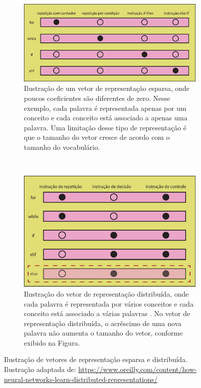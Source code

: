 \begin{figure}[H]
\centering
\begin{subfigure}{.7\textwidth}
  \centering
  \includegraphics[width=1\linewidth]{figuras/cap-trabalhos-relacionados/discrete-representation.pdf}
  \caption{Ilustração de um vetor de representação esparsa, onde poucos coeficientes são diferentes de zero. Nesse exemplo, cada palavra é representada apenas por um conceito e cada conceito está associado a apenas uma palavra. Uma limitação desse tipo de representação é que o tamanho do vetor cresce de acordo com o tamanho do vocabulário.}
  \label{fig:discrete-representation}
\end{subfigure}%
\\
\begin{subfigure}{.7\textwidth}
  \centering
  \includegraphics[width=1\linewidth]{figuras/cap-trabalhos-relacionados/distributed-representation.pdf}
  \caption{Ilustração do vetor de representação distribuída, onde cada palavra é representada por vários conceitos e cada conceito está associado a várias palavras \citep{Hinton-distributed-representatons:1986}. No vetor de representação distribuída, o acréscimo de uma nova palavra não aumenta o tamanho do vetor, conforme exibido na Figura.}
  \label{fig:distributed-representation}
\end{subfigure}

\caption[Ilustração de vetores de representação esparsa e distribuída]{Ilustração de vetores de representação esparsa e distribuída. Ilustração adaptada de: \url{https://www.oreilly.com/content/how-neural-networks-learn-distributed-representations/}}
\label{fig:discrete-vs-distributed-representation}
\end{figure}

